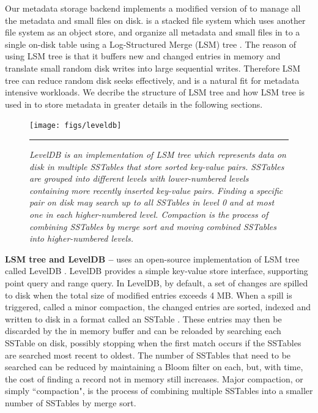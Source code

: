 Our metadata storage backend implements a modified version of \tfs
to manage all the metadata and small files on disk.
\tfs \cite{TableFS} is a stacked file system which uses another file system
as an object store, and organize all metadata and small files in to a single
on-disk table using a Log-Structured Merge (LSM) tree \cite{ONeil1996}.
The reason of using LSM tree is that it buffers new and changed entries in
memory and translate small random disk writes into large sequential writes.
Therefore LSM tree can reduce random disk seeks effectively, and is a natural
fit for metadata intensive workloads. We decribe the structure of LSM tree
and how LSM tree is used in \tfs to store metadata in greater details
in the following sections.

\begin{figure}[t]
\texttt{[image: figs/leveldb]}
\vspace{10pt}
\caption{\textit{
LevelDB is an implementation of LSM tree which represents data on disk
in multiple SSTables that store sorted key-value pairs.
SSTables are grouped into different levels with lower-numbered levels
containing more recently inserted key-value pairs.
Finding a specific pair on disk may search up to all SSTables in level 0
and at most one in each higher-numbered level.
Compaction is the process of combining SSTables
by merge sort and moving combined SSTables into higher-numbered levels.
}}
\vspace{10pt}
\hrule
\label{fig:leveldb}
\end{figure}


\textbf{LSM tree and LevelDB --}
\tfs uses an open-source implementation of LSM tree called LevelDB
\cite{LevelDB}. LevelDB provides a simple key-value store interface,
supporting point query and range query. In LevelDB, by default,
a set of changes are spilled to disk when the total size of modified
entries exceeds 4 MB.  When a spill is triggered, called a
minor compaction, the changed entries are sorted, indexed and written to disk
in a format called an SSTable \cite{BigTable}.  These entries may then be
discarded by the in memory buffer and can be reloaded by searching each SSTable
on disk, possibly stopping when the first match occurs if the SSTables are
searched most recent to oldest.  The number of SSTables that need to be
searched can be reduced by maintaining a Bloom filter\cite{bloomfilter} on each,
but, with time, the cost of finding a record not in memory still increases.
Major compaction, or simply ``compaction",
is the process of combining multiple SSTables
into a smaller number of SSTables by merge sort.

